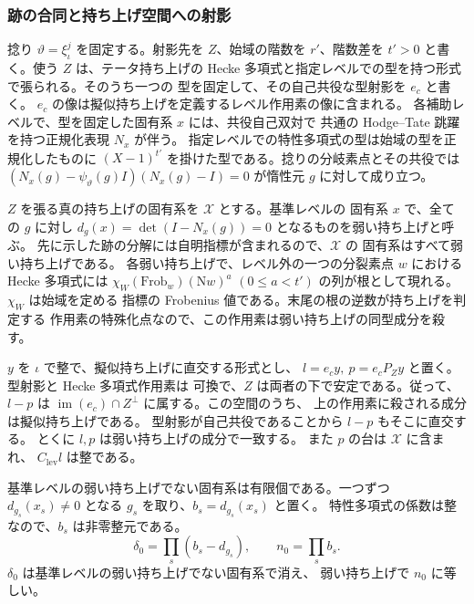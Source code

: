 \subsubsection{跡の合同と持ち上げ空間への射影}

捻り \(\vartheta=\xi_\iota^j\) を固定する。射影先を \(Z\)、始域の階数を
\(r'\)、階数差を \(t'>0\) と書く。使う \(Z\) は、テータ持ち上げの
Hecke 多項式と指定レベルでの型を持つ形式で張られる。そのうち一つの
型を固定して、その自己共役な型射影を \(e_c\) と書く。
\(e_c\) の像は擬似持ち上げを定義するレベル作用素の像に含まれる。
各補助レベルで、型を固定した固有系 \(x\) には、共役自己双対で
共通の Hodge--Tate 跳躍を持つ正規化表現 \(N_x\) が伴う。
指定レベルでの特性多項式の型は始域の型を正規化したものに
\((X-1)^{t'}\) を掛けた型である。捻りの分岐素点とその共役では
\((N_x(g)-\psi_\vartheta(g)I)(N_x(g)-I)=0\) が惰性元 \(g\) に対して成り立つ。

\(Z\) を張る真の持ち上げの固有系を \(\mathcal X\) とする。基準レベルの
固有系 \(x\) で、全ての \(g\) に対し
\(d_g(x)=\det(I-N_x(g))=0\) となるものを弱い持ち上げと呼ぶ。
先に示した跡の分解には自明指標が含まれるので、\(\mathcal X\) の
固有系はすべて弱い持ち上げである。
各弱い持ち上げで、レベル外の一つの分裂素点 \(w\) における
Hecke 多項式には \(\chi_W(\mathrm{Frob}_w)(\mathrm Nw)^a\)
\((0\le a<t')\) の列が根として現れる。\(\chi_W\) は始域を定める
指標の Frobenius 値である。末尾の根の逆数が持ち上げを判定する
作用素の特殊化点なので、この作用素は弱い持ち上げの同型成分を殺す。

\(y\) を \(\iota\) で整で、擬似持ち上げに直交する形式とし、
\(l=e_c y,\ p=e_c P_Z y\) と置く。型射影と Hecke 多項式作用素は
可換で、\(Z\) は両者の下で安定である。従って、\(l-p\) は
\(\operatorname{im}(e_c)\cap Z^\perp\) に属する。この空間のうち、
上の作用素に殺される成分は擬似持ち上げである。
型射影が自己共役であることから \(l-p\) もそこに直交する。
とくに \(l,p\) は弱い持ち上げの成分で一致する。
また \(p\) の台は \(\mathcal X\) に含まれ、
\(C_{\mathrm{lev}}l\) は整である。

基準レベルの弱い持ち上げでない固有系は有限個である。一つずつ
\(d_{g_s}(x_s)\ne0\) となる \(g_s\) を取り、\(b_s=d_{g_s}(x_s)\) と置く。
特性多項式の係数は整なので、\(b_s\) は非零整元である。
\[
 \delta_0=\prod_s(b_s-d_{g_s}),\qquad n_0=\prod_s b_s .
\]
\(\delta_0\) は基準レベルの弱い持ち上げでない固有系で消え、
弱い持ち上げで \(n_0\) に等しい。


